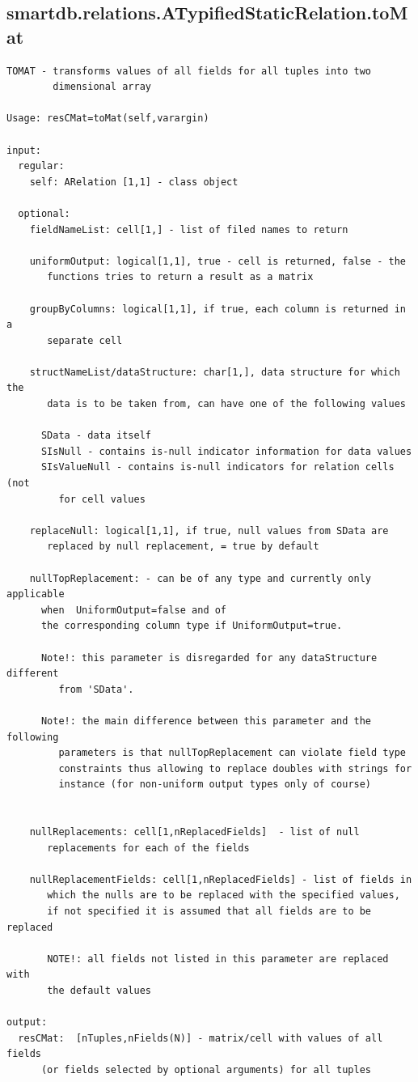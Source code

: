 \documentclass[letterpaper,10pt,english]{sphinxmanual}
\begin{document}
\subsection{smartdb.relations.ATypifiedStaticRelation.toMat}
\label{chap_functions:smartdb-relations-atypifiedstaticrelation-tomat}
\begin{Verbatim}[commandchars=\\\{\}]
TOMAT - transforms values of all fields for all tuples into two
        dimensional array

Usage: resCMat=toMat(self,varargin)

input:
  regular:
    self: ARelation [1,1] - class object

  optional:
    fieldNameList: cell[1,] - list of filed names to return

    uniformOutput: logical[1,1], true - cell is returned, false - the
       functions tries to return a result as a matrix

    groupByColumns: logical[1,1], if true, each column is returned in a
       separate cell

    structNameList/dataStructure: char[1,], data structure for which the
       data is to be taken from, can have one of the following values

      SData - data itself
      SIsNull - contains is-null indicator information for data values
      SIsValueNull - contains is-null indicators for relation cells (not
         for cell values

    replaceNull: logical[1,1], if true, null values from SData are
       replaced by null replacement, = true by default

    nullTopReplacement: - can be of any type and currently only applicable
      when  UniformOutput=false and of
      the corresponding column type if UniformOutput=true.

      Note!: this parameter is disregarded for any dataStructure different
         from 'SData'.

      Note!: the main difference between this parameter and the following
         parameters is that nullTopReplacement can violate field type
         constraints thus allowing to replace doubles with strings for
         instance (for non-uniform output types only of course)


    nullReplacements: cell[1,nReplacedFields]  - list of null
       replacements for each of the fields

    nullReplacementFields: cell[1,nReplacedFields] - list of fields in
       which the nulls are to be replaced with the specified values,
       if not specified it is assumed that all fields are to be replaced

       NOTE!: all fields not listed in this parameter are replaced with
       the default values

output:
  resCMat:  [nTuples,nFields(N)] - matrix/cell with values of all fields
      (or fields selected by optional arguments) for all tuples
\end{Verbatim}
\end{document}
